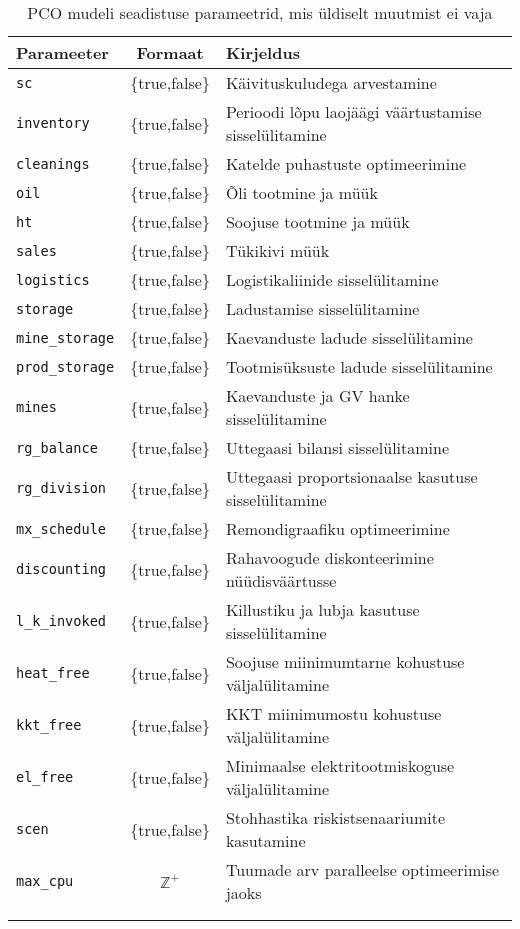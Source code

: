\begin{landscape}
\begin{longtable}{l c l}
Parameeter & Formaat & Kirjeldus \\
\hline
\texttt{sc}              &  \{true,false\}&  Käivituskuludega arvestamine \\
\texttt{inventory}       &  \{true,false\}&  Perioodi lõpu laojäägi väärtustamise sisselülitamine\\
\texttt{cleanings}       &  \{true,false\}&  Katelde puhastuste optimeerimine \\
\texttt{oil}             &  \{true,false\}&  Õli tootmine ja müük\\
\texttt{ht}              &  \{true,false\}&  Soojuse tootmine ja müük\\
\texttt{sales}           &  \{true,false\}&  Tükikivi müük \\
\texttt{logistics}       &  \{true,false\}&  Logistikaliinide sisselülitamine \\
\texttt{storage}         &  \{true,false\}&  Ladustamise sisselülitamine \\
\texttt{mine\_storage}   &  \{true,false\}&  Kaevanduste ladude sisselülitamine \\
\texttt{prod\_storage}   &  \{true,false\}&  Tootmisüksuste ladude sisselülitamine \\
\texttt{mines}           &  \{true,false\}&  Kaevanduste ja GV hanke sisselülitamine \\
\texttt{rg\_balance}     &  \{true,false\}&  Uttegaasi bilansi sisselülitamine \\
\texttt{rg\_division}    &  \{true,false\}&  Uttegaasi proportsionaalse kasutuse sisselülitamine\\
\texttt{mx\_schedule}    &  \{true,false\}&  Remondigraafiku optimeerimine \\
\texttt{discounting}     &  \{true,false\}&  Rahavoogude diskonteerimine nüüdisväärtusse\\
\texttt{l\_k\_invoked}   &  \{true,false\}&  Killustiku ja lubja kasutuse sisselülitamine \\
\texttt{heat\_free}      &  \{true,false\}&  Soojuse miinimumtarne kohustuse väljalülitamine \\
\texttt{kkt\_free}       &  \{true,false\}&  KKT miinimumostu kohustuse väljalülitamine \\
\texttt{el\_free}        &  \{true,false\}&  Minimaalse elektritootmiskoguse väljalülitamine \\
\texttt{scen}            &  \{true,false\}&  Stohhastika riskistsenaariumite kasutamine \\
\texttt{max\_cpu}        &  $\mathbb{Z}^+$&  Tuumade arv paralleelse optimeerimise jaoks \\
\caption{PCO mudeli seadistuse parameetrid, mis üldiselt muutmist ei vaja} \\
\label{tab:conf_spec}
\end{longtable}
\normalsize
\end{landscape}